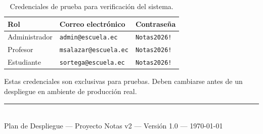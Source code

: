 \documentclass[12pt, a4paper]{article}
\newcommand{\cmd}[1]{\texttt{#1}}
\begin{document}
\begin{table}[H]
    \centering
    \begin{tabular}{lll}
        \toprule
        \textbf{Rol} & \textbf{Correo electrónico} & \textbf{Contraseña} \\
        \midrule
        Administrador & \cmd{admin@escuela.ec}     & \cmd{Notas2026!} \\
        Profesor      & \cmd{msalazar@escuela.ec}  & \cmd{Notas2026!} \\
        Estudiante    & \cmd{sortega@escuela.ec}   & \cmd{Notas2026!} \\
        \bottomrule
    \end{tabular}
    \caption{Credenciales de prueba para verificación del sistema.}
\end{table}

\begin{importante}
    Estas credenciales son exclusivas para pruebas. Deben cambiarse antes de un despliegue en ambiente de producción real.
\end{importante}

\vfill
\begin{center}
    \rule{0.5\linewidth}{0.4pt}\\[0.3cm]
    {\small Plan de Despliegue --- Proyecto Notas v2 --- Versión 1.0 --- \today}
\end{center}
\end{document}
